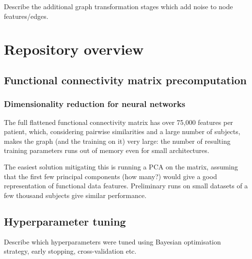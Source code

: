 Describe the additional graph transformation stages which add noise to node features/edges.


\section{Repository overview}


\newpage




\subsection{Functional connectivity matrix precomputation}

\subsubsection{Dimensionality reduction for neural networks}
The full flattened functional connectivity matrix has over 75,000 features per patient, which, considering pairwise similarities and a large number of subjects, makes the graph (and the training on it) very large: the number of resulting training parameters runs out of memory even for small architectures.

The easiest solution mitigating this is running a PCA on the matrix, assuming that the first few principal components (how many?) would give a good representation of functional data features. Preliminary runs on small datasets of a few thousand subjects give similar performance.



\subsection{Hyperparameter tuning}
Describe which hyperparameters were tuned using Bayesian optimisation strategy, early stopping, cross-validation etc.




